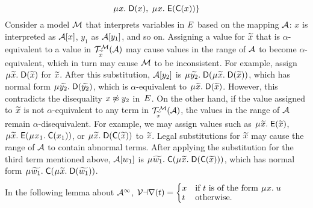 \begin{examplex}
\[\MU x.\; \const{D}( x ),\;
\MU x.\; \const{E}( \const{C}( x ))
\}
\]
Consider a model $\mathcal{M}$ that interprets variables in $E$ based on the mapping $\mathcal{A}$:
$x$ is interpreted as $\mathcal{A} [x]$, $y_1$ as $\mathcal{A} [y_1]$, and so on.
Assigning a value for ${\widetilde{x}}$ that is $\alpha$-equivalent to a value in $\mathcal{T}^{\mathcal{M}}_{{\widetilde{x}}}( \mathcal{A} )$
may cause values in the range of $\mathcal{A}$ to become $\alpha$-equivalent,
which in turn may cause $\mathcal{M}$ to be inconsistent.
For example, assign $\MU {\Varec{x}}.\; \const{D}( {\Varec{x}} )$ for ${\widetilde{x}}$.
After this substitution, $\mathcal{A} [y_2]$ is $\MU {\Varec{y_2}}.\; \const{D}( \MU {\Varec{x}}.\; \const{D}( {\Varec{x}} ) )$,
which has normal form $\MU {\Varec{y_2}}.\; \const{D}( {\Varec{y_2}} )$,
which is $\alpha$-equivalent to $\MU {\Varec{x}}.\; \const{D}( {\Varec{x}} )$.
However, this contradicts the disequality $x \not\approx y_2$ in~$E$.
On the other hand, if the value assigned to ${\widetilde{x}}$ is not $\alpha$-equivalent to any term in $\mathcal{T}^{\mathcal{M}}_{{\widetilde{x}}}( \mathcal{A} )$,
the values in the range of $\mathcal{A}$ remain $\alpha$-disequivalent.
For example, we may assign values such as 
$\MU {\Varec{x}}.\; \const{E}( {\Varec{x}} )$,
$\MU {\Varec{x}}.\; \const{E}( \MU x_1.\; \const{C}( x_1) )$, or
$\MU {\Varec{x}}.\; \const{D}( \const{C}( {\Varec{x}} ) )$
to ${\widetilde{x}}$.
Legal substitutions for ${\widetilde{x}}$ may cause the range of $\mathcal{A}$ to contain abnormal terms.
After applying the substitution for the third term mentioned above,
$\mathcal{A} [w_1]$ is $\MU {\Varec{w_1}}.\; \const{C}( \MU {\Varec{x}}.\; \const{D}( \const{C}( {\Varec{x}} ) ) )$,
which has normal form
$\MU {\Varec{w_1}}.\; \const{C}( \MU {\Varec{x}}.\; \const{D}( {\Varec{w_1}} ) )$.
\xend
\end{examplex}

In the following lemma about $\mathcal{A}^\infty$,
$\vphantom{\Bigl(_j}\muvar( t ) = \smash{\begin{cases}
  x & \text{if $t$ is of the form $\MU {x}.\; u$} \\[-\jot]
  t & \text{otherwise.}
\end{cases}}$

%

